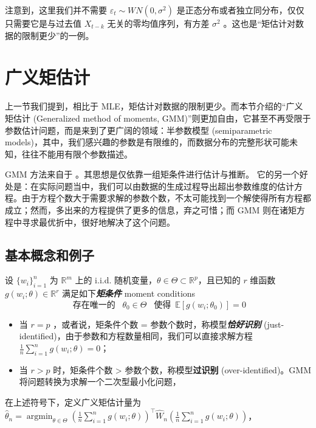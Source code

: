 \begin{remark}
\begin{example}
注意到，这里我们并不需要 $\varepsilon_t\sim WN(0,\sigma^2)$ 是正态分布或者独立同分布，仅仅只需要它是与过去值 $X_{t-k}$ 无关的零均值序列，有方差 $\sigma^2$ 。这也是``矩估计对数据的限制更少''的一例。


\end{example}

\section{广义矩估计}

上一节我们提到，相比于 MLE，矩估计对数据的限制更少。而本节介绍的``广义矩估计 (Generalized method of moments, GMM)''则更加自由，它甚至不再受限于参数估计问题，而是来到了更广阔的领域：半参数模型 (semiparametric models)，其中，我们感兴趣的参数是有限维的，而数据分布的完整形状可能未知，往往不能用有限个参数描述。

GMM 方法来自于 \cite{hansen1982}。其思想是仅依靠一组矩条件进行估计与推断。
它的另一个好处是：在实际问题当中，我们可以由数据的生成过程导出超出参数维度的估计方程。由于方程个数大于需要求解的参数个数，不太可能找到一个解使得所有方程都成立；然而，多出来的方程提供了更多的信息，弃之可惜；而 GMM 则在诸矩方程中寻求最优折中，很好地解决了这个问题。

\subsection{基本概念和例子}

设 $\{w_i\}_{i=1}^n$ 为 $\mathbb{R}^m$ 上的 i.i.d. 随机变量，$\theta \in \Theta \subset \mathbb{R}^p$，且已知的 $r$ 维函数 $g(w_i;\theta)\in\mathbb R^r$ 满足如下\textbf{\emph{矩条件}} moment conditions
\[\text{ 存在唯一的 }\enspace\theta_0\in\Theta\enspace\text{ 使得}\enspace\mathbb{E}[g(w_i;\theta_0)] = 0\]
\begin{itemize}
\tightlist
\item
  当 $r = p$ ，或者说，矩条件个数 = 参数个数时，称模型\textbf{\emph{恰好识别}} (just-identified)，由于参数和方程数量相同，我们可以直接求解方程 $\frac{1}{n}\sum_{i=1}^n g(w_i;\theta)=0$；
\item
  当 $r > p$ 时，矩条件个数 \textgreater{} 参数个数，称模型\textbf{过识别 } (over-identified)。GMM 将问题转换为求解一个二次型最小化问题，
\end{itemize}

\begin{definition*}[广义矩估计]
在上述符号下，定义广义矩估计量为 $\widehat{\theta}_n = \operatorname*{\arg\min}_{{\theta \in \Theta}} \left( \frac1n\sum_{i=1}^n g(w_i;\theta) \right)^\top \widehat{W}_n \left( \frac{1}{n}\sum_{i=1}^n g(w_i;\theta) \right)$，


\end{definition*}
\end{remark}
